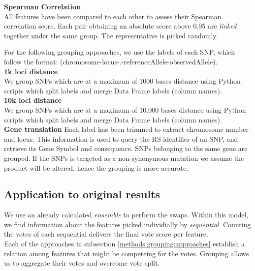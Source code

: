 \textbf{Spearman Correlation}\\
All features have been compared to each other to assess their Spearman correlation score. Each pair obtaining an absolute score above 0.95 are \emph{linked} together under the same group. The representative is picked randomly.

For the following grouping approaches, we use the labels of each SNP, which follow the format: (chromosome-locus-.-referenceAllele-observedAllele).
\\

\textbf{1k loci distance}\\
We group SNPs which are at a maximum of 1000 bases distance using Python scripts which split labels and merge Data Frame labels (column names).
\\

\textbf{10k loci distance}\\
We group SNPs which are at a maximum of 10.000 bases distance using Python scripts which split labels and merge Data Frame labels (column names).
\\

\textbf{Gene translation}
Each label has been trimmed to extract chromosome number and locus. This information is used to query the RS identifier of an SNP, and retrieve its Gene Symbol and consequence. SNPs belonging to the same gene are grouped. If the SNPs is targeted as a non-synonymous mutation we assume the product will be altered, hence the grouping is more accurate.

\subsection{Application to original results}
We use an already calculated \emph{ensemble} to perform the swaps. Within this model, we find information about the features picked individially by \emph{sequential}. Counting the votes of each sequential delivers the final vote score per feature.
\\

Each of the approaches in subsection \ref{methods:grouping:approaches} establish a relation among features that might be competeing for the votes. Grouping allows us to aggregate their votes and overcome vote split.